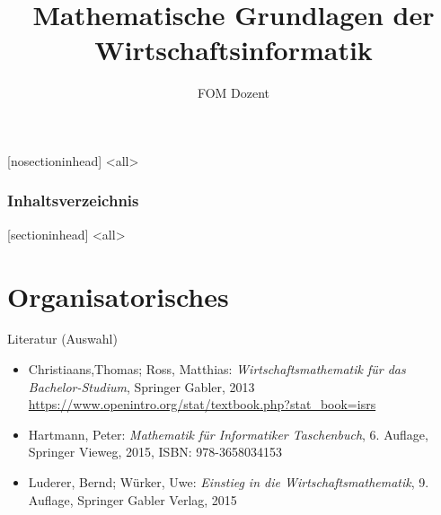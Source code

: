\documentclass[12pt,ngerman,a4paper,ignorenonframetext,]{beamer}
\title{Mathematische Grundlagen der Wirtschaftsinformatik}
\author{FOM Dozent}
\institute{FOM}
\date{}
\providecommand{\tightlist}{%
  \setlength{\itemsep}{0pt}\setlength{\parskip}{0pt}}
\begin{document}
\frame{\titlepage}


%
%
  [nosectioninhead]
\mode<all>
\begin{frame}
  \frametitle{Inhaltsverzeichnis}
  \flushcolumns %
  \setlength{\columnsep}{0.2cm}%
  \begin{multicols}{2}
    \tableofcontents[hideallsubsections]
  \end{multicols}
\end{frame}
  [sectioninhead]
\mode<all>

%
%

\hypertarget{organisatorisches}{%
\section{Organisatorisches}\label{organisatorisches}}

\begin{frame}{Literatur (Auswahl)}
\protect\hypertarget{literatur-auswahl}{}

\begin{itemize}
\tightlist
\item
  Christiaans,Thomas; Ross, Matthias: \emph{Wirtschaftsmathematik für
  das Bachelor-Studium}, Springer Gabler, 2013
  \url{https://www.openintro.org/stat/textbook.php?stat_book=isrs}
\item
  Hartmann, Peter: \emph{Mathematik für Informatiker Taschenbuch}, 6.
  Auflage, Springer Vieweg, 2015, ISBN: 978-3658034153
\item
  Luderer, Bernd; Würker, Uwe: \emph{Einstieg in die
  Wirtschaftsmathematik}, 9. Auflage, Springer Gabler Verlag, 2015
\end{itemize}

\end{frame}
\end{document}
